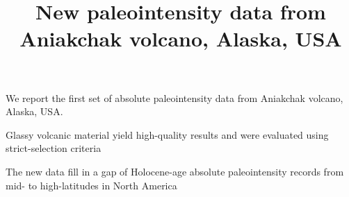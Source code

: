 \documentclass[draft]{agujournal2019}
\begin{document}
\title{New paleointensity data from Aniakchak volcano, Alaska, USA}





\begin{keypoints}
\item We report the first set of absolute paleointensity data from Aniakchak volcano, Alaska, USA.
\item Glassy volcanic material yield high-quality results and were evaluated using strict-selection criteria
\item The new data fill in a gap of Holocene-age absolute paleointensity records from mid- to high-latitudes in North America
\end{keypoints}
\end{document}
